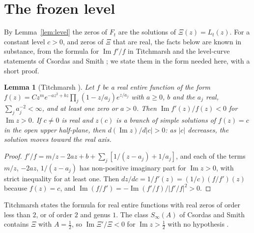 \documentclass[11pt]{article}
\theoremstyle{plain}
\newtheorem{lemma}[theorem]{Lemma}
\theoremstyle{definition}
\theoremstyle{remark}
\newcommand{\im}{\operatorname{Im}}
\begin{document}
\section{The frozen level}\label{sec:frozen}

By Lemma~\ref{lem:level} the zeros of $F_t$ are the solutions of
$\Xi(z) = L_t(z)$. For a constant level $c > 0$, and zeros of $\Xi$ that are
real, the facts below are known in substance, from the formula for $\im f'/f$
in Titchmarsh \cite[\S8.52, p.~266]{Tit} and the level-curve statements of
Csordas and Smith \cite[(2.5), p.~604; (3.3)--(3.4), p.~609]{CS}; we state
them in the form needed here, with a short proof.

\begin{lemma}[Titchmarsh {\cite[\S8.52, p.~266]{Tit}}]\label{lem:tit}
Let $f$ be a real entire function of the form
$f(z) = Cz^m e^{-az^2 + bz}\prod_j(1 - z/a_j)e^{z/a_j}$ with $a \ge 0$, $b$ and
the $a_j$ real, $\sum_j a_j^{-2} < \infty$, and at least one zero or $a > 0$.
Then $\im f'(z)/f(z) < 0$ for $\im z > 0$. If $c \ne 0$ is real and $z(c)$ is
a branch of simple solutions of $f(z) = c$ in the open upper half-plane, then
$d(\im z)/d|c| > 0$: as $|c|$ decreases, the solution moves toward the real
axis.
\end{lemma}

\begin{proof}
$f'/f = m/z - 2az + b + \sum_j[1/(z - a_j) + 1/a_j]$, and each of the terms
$m/z$, $-2az$, $1/(z - a_j)$ has non-positive imaginary part for $\im z > 0$,
with strict inequality for at least one. Then $dz/dc = 1/f'(z) = (1/c)(f/f')(z)$
because $f(z) = c$, and $\im(f/f') = -\im(f'/f)/|f'/f|^2 > 0$.
\end{proof}

Titchmarsh states the formula for real entire functions with real zeros of
order less than $2$, or of order $2$ and genus $1$. The class $S_\infty(A)$ of
Csordas and Smith \cite[Definition~1.2, p.~602]{CS} contains $\Xi$ with
$A = \frac12$, so $\im\Xi'/\Xi < 0$ for $\im z > \frac12$ with no
hypothesis \cite[(2.5), p.~604]{CS}.
\end{document}
